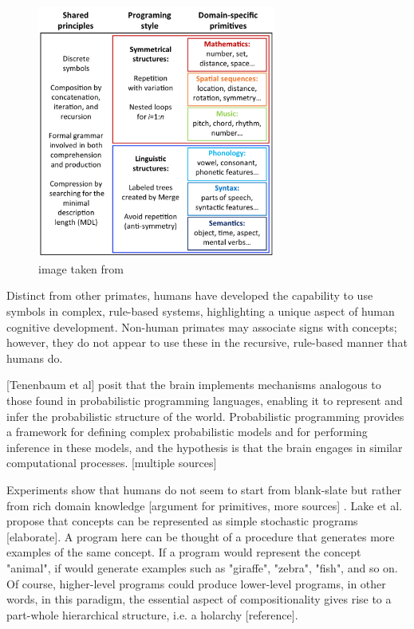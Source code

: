 \begin{figure}[H]
    \centering
    \includegraphics[width=0.7\textwidth]{../img/DSL.png}
    \caption{image taken from \cite{dehaene_symbols_2022}}
    \label{fig:DSL}
\end{figure}

Distinct from other primates, humans have developed the capability to use symbols in complex, rule-based systems, highlighting a unique aspect of human cognitive development. Non-human primates may associate signs with concepts; however, they do not appear to use these in the recursive, rule-based manner that humans do.

[Tenenbaum et al] posit that the brain implements mechanisms analogous to those found in probabilistic programming languages, enabling it to represent and infer the probabilistic structure of the world. Probabilistic programming provides a framework for defining complex probabilistic models and for performing inference in these models, and the hypothesis is that the brain engages in similar computational processes. [multiple sources]

Experiments show that humans do not seem to start from blank-slate but rather from rich domain knowledge [argument for primitives, more sources] \cite{lake_building_2016}. Lake et al. propose that concepts can be represented as simple stochastic programs [elaborate]. A program here can be thought of a procedure that generates more examples of the same concept. If a program would represent the concept "animal", if would generate examples such as "giraffe", "zebra", "fish", and so on. Of course, higher-level programs could produce lower-level programs, in other words, in this paradigm, the essential aspect of compositionality gives rise to a part-whole hierarchical structure, i.e. a holarchy [reference].

